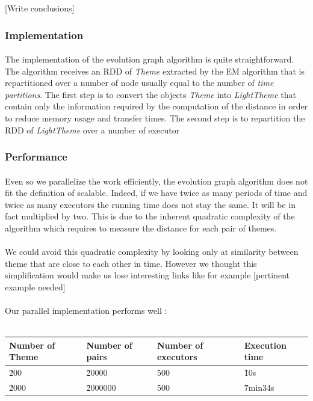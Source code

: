 [Write conclusions]

\subsubsection{Implementation}
\label{sec:EvoGraphImplementation}
\paragraph{}
The implementation of the evolution graph algorithm is quite straightforward. The algorithm receives an RDD of \emph{Theme} extracted by the EM algorithm that is repartitioned over a number of node usually equal to the number of \emph{time partitions}. The first step is to convert the objects \emph{Theme} into \emph{LightTheme} that contain only the information required by the computation of the distance in order to reduce memory usage and transfer times. The second step is to repartition the RDD of \emph{LightTheme} over a number of executor 

\subsubsection{Performance}
\label{sec:EvoGraphPerformance}
\paragraph{}
Even so we parallelize the work efficiently, the evolution graph algorithm does not fit the definition of scalable. Indeed, if we have twice as many periods of time and twice as many executors the running time does not stay the same. It will be in fact multiplied by two. This is due to the inherent quadratic complexity of the algorithm which requires to measure the distance for each pair of themes.

\paragraph{}
We could avoid this quadratic complexity by looking only at similarity between theme that are close to each other in time. However we thought this simplification would make us lose interesting links like for example [pertinent example needed]

\paragraph{}
Our parallel implementation performs well :\\
~\newline
\begin{tabular}{l|l|l|l}
Number of Theme & Number of pairs & Number of executors & Execution time \\ \hline
\~ 200 & \~ 20000 & 500 & \~ 10s \\
\~ 2000 & \~ 2000000 & 500 & \~ 7min34s \\
\end{tabular}


